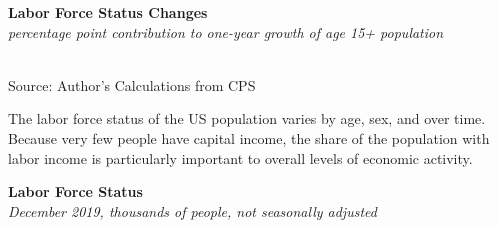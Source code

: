 \documentclass{report}
\makeatletter
\newcommand{\tbllink}[1]{\href{https://raw.githubusercontent.com/bdecon/US-chartbook/master/chartbook/data/#1}{\faTable}}
\newcommand*\short[1]{\expandafter\@gobbletwo\number\numexpr#1\relax}
\newcommand{\sbar}[4]{
		\addplot[ybar stacked, bar width=2.7pt, draw opacity=0, fill=#1] 
			table [x=#2, y=#3, col sep=comma]{#4};}
\newcommand{\dateaxisticks}{
		date coordinates in=x, axis line style={draw=none},
		xmax={2020-02-01},
		max space between ticks=40,	    
		xtick={{1990-01-01}, {1992-01-01}, {1994-01-01}, 
			{1996-01-01}, {1998-01-01}, {2000-01-01}, 
			{2002-01-01}, {2004-01-01}, {2006-01-01},
			{2008-01-01}, {2010-01-01}, {2012-01-01}, {2014-01-01},
		    {2016-01-01}, {2018-01-01}, {2020-01-01}},
		minor xtick={{1989-01-01}, {1991-01-01}, {1993-01-01},
			{1995-01-01}, {1997-01-01}, {1999-01-01}, 
			{2001-01-01}, {2003-01-01}, {2005-01-01}, {2007-01-01},
		    {2009-01-01}, {2011-01-01}, {2013-01-01}, {2015-01-01},
		    {2017-01-01}, {2019-01-01}},
		enlarge y limits={0.06}, enlarge x limits={0.01},
		}
\newcommand{\bbar}[2]{extra #1 ticks = {{#2}}, extra #1 tick labels = ,
		extra #1 tick style = {grid=major, grid style={thick, black!25}},}
\newcommand{\rbars}{
		\fill[color=black!10] (axis cs:{1990-07-01},\pgfkeysvalueof{/pgfplots/ymin}) rectangle 
			(axis cs:{1991-03-01}, \pgfkeysvalueof{/pgfplots/ymax});
		\fill[color=black!10] (axis cs:{2007-12-01},\pgfkeysvalueof{/pgfplots/ymin}) rectangle 
			(axis cs:{2009-07-01}, \pgfkeysvalueof{/pgfplots/ymax});
		\fill[color=black!10] (axis cs:{2001-03-01},\pgfkeysvalueof{/pgfplots/ymin}) rectangle 
			(axis cs:{2001-11-01}, \pgfkeysvalueof{/pgfplots/ymax});}
\makeatother
\begin{document}
{{{{\begin{minipage}{0.76\textwidth}
\noindent \normalsize \textbf{Labor Force Status Changes}\\
\footnotesize{\textit{percentage point contribution to one-year growth of age 15+ population}}\\
\noindent \hspace*{-2mm} \\
\footnotesize{Source: Author's Calculations from CPS} \hfill \tbllink{cps_lfs2.csv}

\end{minipage}

\newpage

\begin{minipage}{0.76\textwidth}

\small The labor force status of the US population varies by age, sex, and over time. Because very few people have capital income, the share of the population with labor income is particularly important to overall levels of economic activity. \\

\vspace{1mm}


\noindent \normalsize \textbf{Labor Force Status}\\
\footnotesize{\textit{December 2019, thousands of people, not seasonally adjusted}}\\

\vspace{-3mm}

\noindent {} \setlength{\tabcolsep}{3.0pt} \color{black!90}
		{\renewcommand{\arraystretch}{1.52}
		 \begin{tabular}{p{27.8mm} R{11.2mm} R{10.4mm} R{10.4mm} R{10.2mm} R{10.6mm} R{10.4mm} R{10.4mm}}
			 \hline
		\end{tabular}
		}	\\
		

\end{minipage}}}}}
\end{document}
